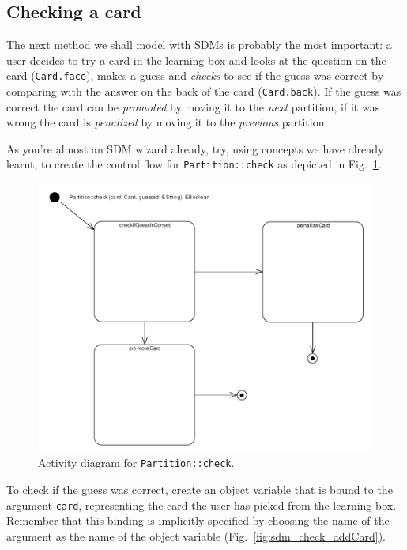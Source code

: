 \subsection{Checking a card}

The next method we shall model with SDMs is probably the most important: a user decides to try a card in the learning box and looks at the question on the card (\texttt{Card.face}), makes a guess and \emph{checks} to see if the guess was correct by comparing with the answer on the back of the card (\texttt{Card.back}).
If the guess was correct the card can be \emph{promoted} by moving it to the \emph{next} partition, if it was wrong the card is \emph{penalized} by moving it to the \emph{previous} partition.

As you're almost an SDM wizard already, try, using concepts we have already learnt, to create the control flow for \texttt{Partition::check} as depicted in Fig.~\ref{fig:sdm_check_start}.

\begin{figure}[htbp]
\begin{center}
  \includegraphics[width=\textwidth]{pics/sdmBilder/check/sdm16RAW.pdf}
  \caption{Activity diagram for \texttt{Partition::check}.}
  \label{fig:sdm_check_start}
\end{center}
\end{figure}

To check if the guess was correct, create an object variable that is bound to
the argument \texttt{card}, representing the card the user has picked from the
learning box.  Remember that this binding is implicitly specified by choosing the
name of the argument as the name of the object variable
(Fig.~\ref{fig:sdm_check_addCard}).

